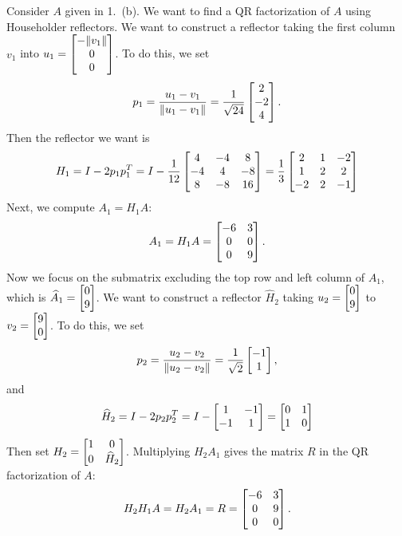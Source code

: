 \documentclass{homework}
\begin{document}
\begin{alphaparts}
		\questionpart Consider $A$ given in 1.\ (b). We want to find a QR factorization of $A$ using Householder reflectors. We want to construct a reflector taking the first column $v_1$ into $u_1 = \left[\begin{matrix}-\lVert v_1\rVert \\ 0 \\ 0\end{matrix}\right]$. To do this, we set 
		\begin{equation*}
			p_1 = \frac{u_1 - v_1}{\lVert u_1-v_1\rVert} = \frac{1}{\sqrt{24}}\left[\begin{matrix}2 \\ -2 \\ 4\end{matrix}\right].
		\end{equation*}
		Then the reflector we want is
		\begin{equation*}
			H_1 = I - 2p_1p_1^T = I - \frac{1}{12}\left[\begin{matrix}4 & -4 & 8 \\ -4 & 4 & -8 \\ 8 & -8 & 16\end{matrix}\right] = \frac{1}{3}\left[\begin{matrix}2 & 1 & -2 \\ 1 & 2 & 2 \\ -2 & 2 & -1\end{matrix}\right]
		\end{equation*}
		Next, we compute $A_1 = H_1A$:
		\begin{equation*}
			A_1 = H_1A = \left[\begin{matrix}-6 & 3 \\ 0 & 0 \\0 & 9\end{matrix}\right].
		\end{equation*}
		Now we focus on the submatrix excluding the top row and left column of $A_1$, which is $\widehat{A}_1 = \left[\begin{matrix}0\\9\end{matrix}\right]$. We want to construct a reflector $\widehat{H}_2$ taking $u_2 = \left[\begin{matrix}0\\9\end{matrix}\right]$ to $v_2 = \left[\begin{matrix}9 \\ 0\end{matrix}\right]$. To do this, we set
		\begin{equation*}
			p_2 = \frac{u_2 - v_2}{\lVert u_2 - v_2\rVert} = \frac{1}{\sqrt{2}}\left[\begin{matrix}-1\\1\end{matrix}\right],
		\end{equation*}
		and
		\begin{equation*}
			\widehat{H}_2 = I - 2p_2p_2^T = I - \left[\begin{matrix}1 & -1 \\ -1 & 1\end{matrix}\right]=\left[\begin{matrix}0 & 1 \\ 1 & 0\end{matrix}\right]
		\end{equation*}
		Then set $H_2 = \left[\begin{matrix}1 & 0 \\ 0 & \widehat{H}_2\end{matrix}\right]$. Multiplying $H_2A_1$ gives the matrix $R$ in the QR factorization of $A$:
		\begin{equation*}
			H_2H_1A = H_2A_1 = R = \mat{-6 & 3 \\ 0 & 9 \\ 0& 0}.

\end{equation*}
\end{alphaparts}
\end{document}
